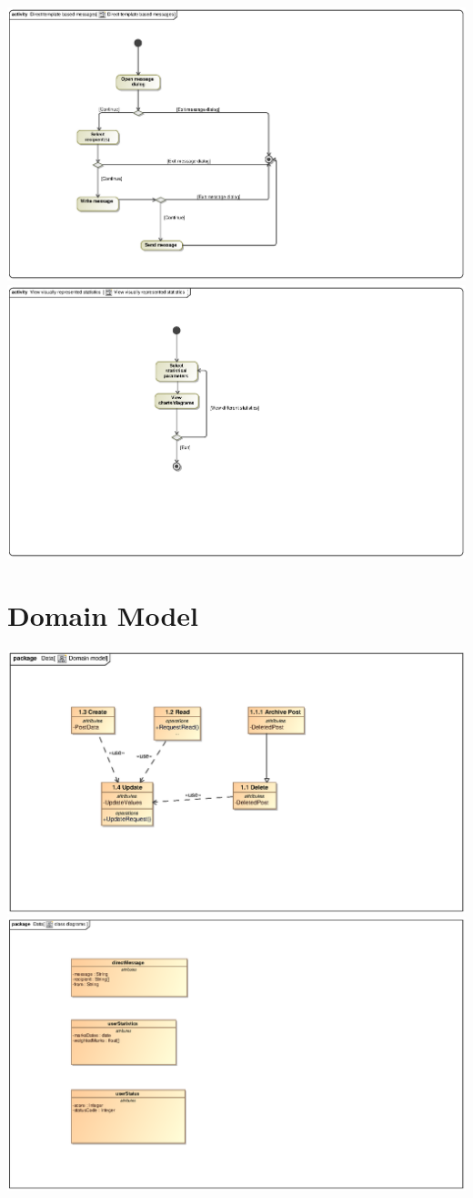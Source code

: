 \documentclass{scrreprt}
\begin{document}
\includegraphics[scale=.9]{seanAC.eps}\\
\includegraphics[scale=.9]{seanAC1.eps}
\chapter{Domain Model}   								%
\includegraphics[scale=.9]{CRUDDomainModel.eps}\\
\includegraphics[scale=.9]{seanDM.eps}			
\end{document}
